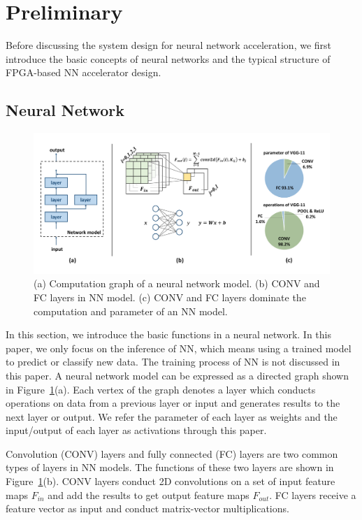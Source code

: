 \section{Preliminary}\label{sec:preliminary}

Before discussing the system design for neural network acceleration, we first introduce the basic concepts of neural networks and the typical structure of FPGA-based NN accelerator design.

\subsection{Neural Network}

\begin{figure}[ht]
    \centering
    \includegraphics[width=1.0\columnwidth]{fig/cnn_preliminary.pdf}
    \caption{(a) Computation graph of a neural network model. (b) CONV and FC layers in NN model. (c) CONV and FC layers dominate the computation and parameter of an NN model.}
    \label{fig:cnn_preliminary}
\end{figure}

In this section, we introduce the basic functions in a neural network. In this paper, we only focus on the inference of NN, which means using a trained model to predict or classify new data. The training process of NN is not discussed in this paper. A neural network model can be expressed as a directed graph shown in Figure~\ref{fig:cnn_preliminary}(a). Each vertex of the graph denotes a layer which conducts operations on data from a previous layer or input and generates results to the next layer or output. We refer the parameter of each layer as weights and the input/output of each layer as activations through this paper. 

Convolution (CONV) layers and fully connected (FC) layers are two common types of layers in NN models. The functions of these two layers are shown in Figure~\ref{fig:cnn_preliminary}(b). CONV layers conduct 2D convolutions on a set of input feature maps $F_{in}$ and add the results to get output feature maps $F_{out}$. FC layers receive a feature vector as input and conduct matrix-vector multiplications.

